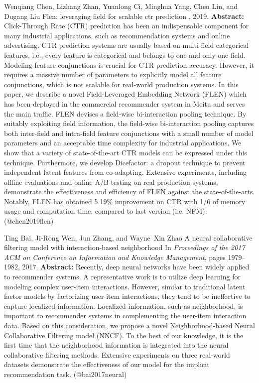 \documentclass{article}
\begin{document}
\begin{thebibliography}{}
 Wenqiang Chen, Lizhang Zhan, Yuanlong Ci, Minghua Yang, Chen Lin, and Dugang Liu \newblock Flen: leveraging field for scalable ctr prediction , 2019. \newblock \textbf{Abstract:} Click-Through Rate (CTR) prediction has been an indispensable component for many industrial applications, such as recommendation systems and online advertising. CTR prediction systems are usually based on multi-field categorical features, i.e., every feature is categorical and belongs to one and only one field. Modeling feature conjunctions is crucial for CTR prediction accuracy. However, it requires a massive number of parameters to explicitly model all feature conjunctions, which is not scalable for real-world production systems. In this paper, we describe a novel Field-Leveraged Embedding Network (FLEN) which has been deployed in the commercial recommender system in Meitu and serves the main traffic. FLEN devises a field-wise bi-interaction pooling technique. By suitably exploiting field information, the field-wise bi-interaction pooling captures both inter-field and intra-field feature conjunctions with a small number of model parameters and an acceptable time complexity for industrial applications. We show that a variety of state-of-the-art CTR models can be expressed under this technique. Furthermore, we develop Dicefactor: a dropout technique to prevent independent latent features from co-adapting. Extensive experiments, including offline evaluations and online A/B testing on real production systems, demonstrate the effectiveness and efficiency of FLEN against the state-of-the-arts. Notably, FLEN has obtained 5.19\% improvement on CTR with 1/6 of memory usage and computation time, compared to last version (i.e. NFM). \newblock (@chen2019flen)

 Ting Bai, Ji-Rong Wen, Jun Zhang, and Wayne~Xin Zhao \newblock A neural collaborative filtering model with interaction-based neighborhood \newblock In {\em Proceedings of the 2017 ACM on Conference on Information and Knowledge Management}, pages 1979--1982, 2017. \newblock \textbf{Abstract:} Recently, deep neural networks have been widely applied to recommender systems. A representative work is to utilize deep learning for modeling complex user-item interactions. However, similar to traditional latent factor models by factorizing user-item interactions, they tend to be ineffective to capture localized information. Localized information, such as neighborhood, is important to recommender systems in complementing the user-item interaction data. Based on this consideration, we propose a novel Neighborhood-based Neural Collaborative Filtering model (NNCF). To the best of our knowledge, it is the first time that the neighborhood information is integrated into the neural collaborative filtering methods. Extensive experiments on three real-world datasets demonstrate the effectiveness of our model for the implicit recommendation task. \newblock (@bai2017neural)


\end{thebibliography}
\end{document}
